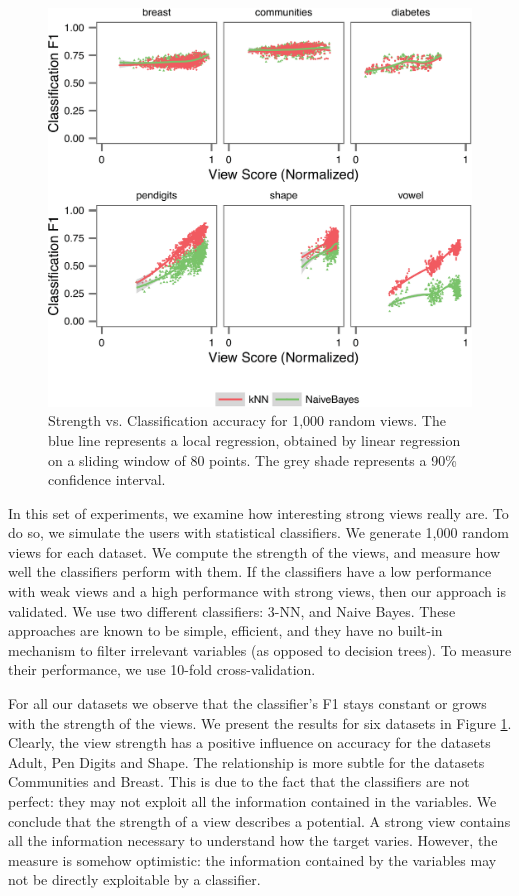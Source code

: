 \begin{figure}[t!]
\centering
\includegraphics[width=\columnwidth]{plots/compare-strength-f1}
\caption{Strength vs. Classification accuracy for 1,000 random views. The blue
    line represents a local regression, obtained by linear regression on a
    sliding window of 80 points. The grey shade represents a 90\% confidence
interval.}
\label{pic:strength-vs-f1}
\end{figure}

In this set of experiments, we examine how interesting strong views really are.
To do so, we simulate the users with statistical classifiers.  We generate
1,000 random views for each dataset. We compute the strength of the views, and
measure how well the classifiers perform with them. If the classifiers have a
low performance with weak views and a high performance with strong views, then
our approach is validated. We use two different classifiers: 3-NN, and Naive
Bayes.  These approaches are known to be simple, efficient, and they have no
built-in mechanism to filter irrelevant variables (as opposed to decision
trees). To measure their performance, we use 10-fold cross-validation.

For all our datasets we observe that the classifier's F1 stays constant or
grows with the strength of the views. We present the results for six datasets
in Figure \ref{pic:strength-vs-f1}. Clearly, the view strength has a positive
influence on accuracy for the datasets Adult, Pen Digits and Shape. The
relationship is more subtle for the datasets Communities and Breast. This is
due to the fact that the classifiers are not perfect: they may not exploit all
the information contained in the variables. We conclude that the strength of a
view describes a potential. A strong view contains all the information
necessary to understand how the target varies. However, the measure is somehow
optimistic: the information contained by the variables may not be directly
exploitable by a classifier.



